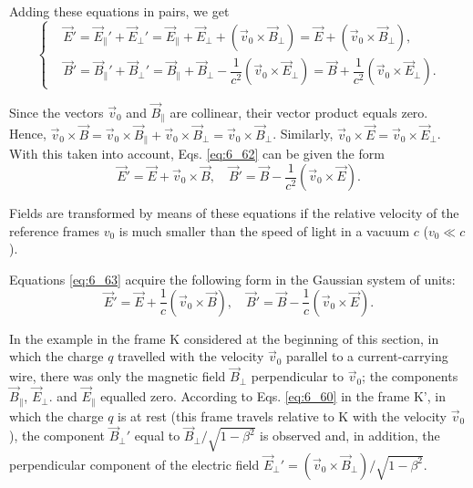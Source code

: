 \noindent
Adding these equations in pairs, we get
\begin{equation}\label{eq:6_62}
    \begin{cases}
        & \!\!\!\!\! \vec{E}' = \vec{E}_{\parallel}' + \vec{E}_{\perp}' = \vec{E}_{\parallel} + \vec{E}_{\perp} + (\vec{v}_0 \times \vec{B}_{\perp}) = \vec{E} + (\vec{v}_0 \times \vec{B}_{\perp}),\\
        & \!\!\!\!\! \vec{B}' = \vec{B}_{\parallel}' + \vec{B}_{\perp}' = \vec{B}_{\parallel} + \vec{B}_{\perp} - \dfrac{1}{c^2} (\vec{v}_0 \times \vec{E}_{\perp}) = \vec{B} + \dfrac{1}{c^2} (\vec{v}_0 \times \vec{E}_{\perp}).
    \end{cases}
\end{equation}

Since the vectors $\vec{v}_0$ and $\vec{B}_{\parallel}$ are collinear, their vector product equals zero. Hence, $\vec{v}_0 \times \vec{B} = \vec{v}_0 \times \vec{B}_{\parallel} + \vec{v}_0 \times \vec{B}_{\perp} = \vec{v}_0 \times \vec{B}_{\perp}$.
Similarly, $\vec{v}_0 \times \vec{E} = \vec{v}_0 \times \vec{E}_{\perp}$. With this taken into account, Eqs. \eqref{eq:6_62} can be given the form
\begin{equation}\label{eq:6_63}
    \vec{E}' = \vec{E} + \vec{v}_0 \times \vec{B},\quad \vec{B}' = \vec{B} - \dfrac{1}{c^2} (\vec{v}_0 \times \vec{E}).
\end{equation}

\noindent
Fields are transformed by means of these equations if the relative velocity of the reference frames $v_0$ is much smaller than the speed of light in a vacuum $c$ ($v_0\ll c$).

Equations \eqref{eq:6_63} acquire the following form in the Gaussian system of units:
\begin{equation}\label{eq:6_64}
    \vec{E}' = \vec{E} + \dfrac{1}{c} (\vec{v}_0 \times \vec{B}),\quad \vec{B}' = \vec{B} - \dfrac{1}{c} (\vec{v}_0 \times \vec{E}).
\end{equation}

In the example in the frame K considered at the beginning of this section, in which the charge $q$  travelled with the velocity $\vec{v}_0$ parallel to a current-carrying wire, there was only the magnetic field $\vec{B}_{\perp}$ perpendicular to $\vec{v}_0$; the components $\vec{B}_{\parallel}$, $\vec{E}_{\perp}$. and $\vec{E}_{\parallel}$ equalled zero.
According to Eqs. \eqref{eq:6_60} in the frame K', in which the charge $q$ is at rest (this frame travels relative to K with the velocity $\vec{v}_0$), the component $\vec{B}_{\perp}'$ equal to $\vec{B}_{\perp}/\sqrt{1-\beta^2}$ is observed and, in addition, the perpendicular component of the electric field $\vec{E}_{\perp}'=(\vec{v}_0 \times \vec{B}_{\perp})/\sqrt{1-\beta^2}$.

